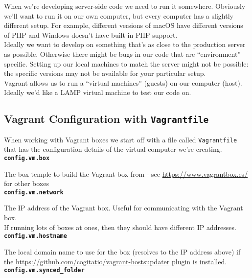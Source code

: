 When we're developing server-side code we need to run it somewhere. Obviously we'll want to run it on our own computer, but every computer has a slightly different setup. For example, different versions of macOS have different versions of PHP and Windows doesn't have built-in PHP support.
\\

Ideally we want to develop on something that's as close to the production server as possible. Otherwise there might be bugs in our code that are ``environment'' specific. Setting up our local machines to match the server might not be possible: the specific versions may not be available for your particular setup.
\\

Vagrant allows us to run a ``virtual machines'' (guests) on our computer (host).
\\

Ideally we'd like a LAMP virtual machine to test our code on.

\subsection{Vagrant Configuration with \texttt{Vagrantfile}}

When working with Vagrant boxes we start off with a file called \texttt{Vagrantfile} that has the configuration details of the virtual computer we're creating.
\\

\textbf{\texttt{config.vm.box}}

The box temple to build the Vagrant box from - see \href{vagrantbox.es}{https://www.vagrantbox.es/} for other boxes
\\

\textbf{\texttt{config.vm.network}}

The IP address of the Vagrant box. Useful for communicating with the Vagrant box.
\\

If running lots of boxes at ones, then they should have different IP addresses.
\\

\textbf{\texttt{config.vm.hostname}}

The local domain name to use for the box (resolves to the IP address above) if the \href{vagrant-hostsupdater}{https://github.com/cogitatio/vagrant-hostsupdater} plugin is installed.
\\

\textbf{\texttt{config.vm.synced\_folder}}

